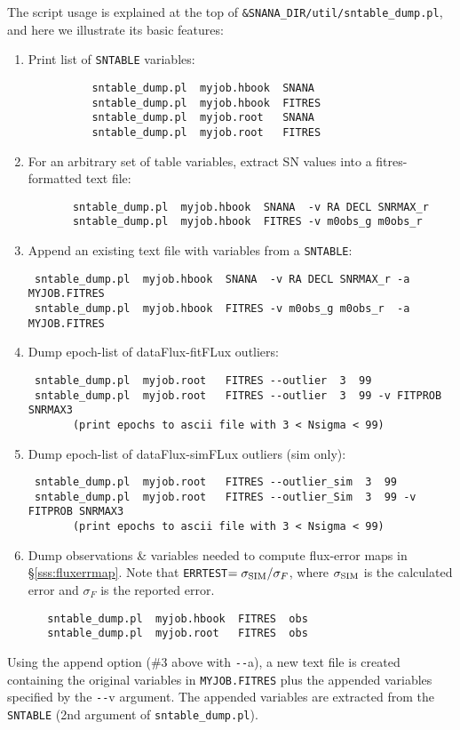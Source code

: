 \documentclass[12pt]{article}
\newcommand{\sigSIM}{\sigma_{\rm SIM}}
\newcommand{\sndump}{{\tt sntable\_dump.pl}}
\begin{document}
{The script usage is explained at the top of
{\tt \&SNANA\_DIR/util/sntable\_dump.pl},
and here we illustrate its basic features:
\begin{enumerate}
  \item Print list of {\tt SNTABLE} variables: 
       \begin{verbatim}
          sntable_dump.pl  myjob.hbook  SNANA
          sntable_dump.pl  myjob.hbook  FITRES
          sntable_dump.pl  myjob.root   SNANA
          sntable_dump.pl  myjob.root   FITRES
       \end{verbatim}
%
  \item For an arbitrary set of table variables, 
        extract SN values  into a fitres-formatted text file:
       \begin{verbatim}
       sntable_dump.pl  myjob.hbook  SNANA  -v RA DECL SNRMAX_r
       sntable_dump.pl  myjob.hbook  FITRES -v m0obs_g m0obs_r
       \end{verbatim}
%
  \item Append an existing text file with variables from a {\tt SNTABLE}:
       \begin{verbatim}
 sntable_dump.pl  myjob.hbook  SNANA  -v RA DECL SNRMAX_r -a MYJOB.FITRES
 sntable_dump.pl  myjob.hbook  FITRES -v m0obs_g m0obs_r  -a MYJOB.FITRES
       \end{verbatim}
%
  \item Dump epoch-list of dataFlux-fitFLux  outliers:
       \begin{verbatim}
 sntable_dump.pl  myjob.root   FITRES --outlier  3  99
 sntable_dump.pl  myjob.root   FITRES --outlier  3  99 -v FITPROB SNRMAX3
       (print epochs to ascii file with 3 < Nsigma < 99)
       \end{verbatim}
%
  \item Dump epoch-list of dataFlux-simFLux  outliers (sim only):
       \begin{verbatim}
 sntable_dump.pl  myjob.root   FITRES --outlier_sim  3  99
 sntable_dump.pl  myjob.root   FITRES --outlier_Sim  3  99 -v FITPROB SNRMAX3
       (print epochs to ascii file with 3 < Nsigma < 99)
       \end{verbatim}
%
  \item Dump observations \& variables needed to compute flux-error maps 
      in \S\ref{sss:fluxerrmap}. Note that {\tt ERRTEST}$=\sigSIM/\sigma_F$,
      where $\sigSIM$ is the calculated error and $\sigma_F$ is the 
      reported error.
       \begin{verbatim}
   sntable_dump.pl  myjob.hbook  FITRES  obs
   sntable_dump.pl  myjob.root   FITRES  obs
       \end{verbatim}
\end{enumerate}
%
Using the append option (\#3 above with {\texttt{-{}-}a}), 
a new text file is created containing the original variables in 
{\tt MYJOB.FITRES} plus the appended variables specified by the
 \texttt{-{}-}v argument.
The appended variables are extracted from the {\tt SNTABLE}
(2nd argument of {\sndump}).

}
\end{document}
